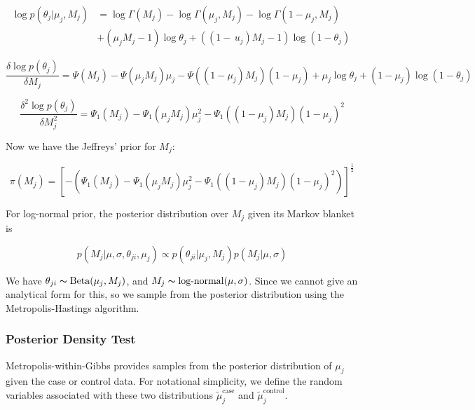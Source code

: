 \documentclass[11pt,reqno]{amsart}
\begin{document}
\begin{equation}\label{equ:JefferyInference1}
\begin{split}
\log p\left(\theta_{j}|\mu_{j},M_{j}\right)& =\log \Gamma \left(M_{j}\right)-\log \Gamma\left(\mu_{j},M_{j}\right)- \log \Gamma\left(1-\mu_{j},M_{j}\right)\\
& + (\mu_{j}M_{j}-1)\log\theta_{j} + ((1-\,u_{j})M_{j}-1)\log(1-\theta_{j})\
\end{split}
\end{equation}

\begin{equation}
\frac{\delta\log p(\theta_{j})}{\delta M_{j}} = \Psi(M_{j}) - \Psi(\mu_{j} M_{j})\mu_{j} - \Psi((1-\mu_{j})M_{j})(1-\mu_{j}) +\mu_{j}\log\theta_{j} + (1-\mu_{j})\log(1-\theta_{j})
\end{equation}

\begin{equation}
\frac{\delta^{2}\log p(\theta_{j})}{\delta M_{j}^{2}}  = \Psi_{1}(M_{j}) - \Psi_{1}(\mu_{j} M_{j})\mu_{j}^{2} - \Psi_{1}((1-\mu_{j})M_{j})(1-\mu_{j})^{2}
\end{equation}

Now we have the Jeffreys' prior for $M_{j}$:

\begin{equation}
\pi\left({M}_{j}\right) = [-\left(\Psi_{1}(M_{j}) - \Psi_{1}(\mu_{j} M_{j})\mu_{j}^{2} - \Psi_{1}((1-\mu_{j})M_{j}){(1-\mu_{j})^{2}}\right)]^{\frac{1}{2}}
\end{equation}

For log-normal prior, the posterior distribution over $M_{j}$ given its Markov blanket is

\begin{equation}
	p( M_{j} |\mu, \sigma, \theta_{ji},\mu_j) \propto p(\theta_{ji} | \mu_j, M_j) p(M_{j} | \mu, \sigma)
\end{equation}

We have $ \theta_{ji}\thicksim\text{Beta}(\mu_{j},M_{j})$, and $ M_{j} \thicksim \text{log-normal}(\mu, \sigma)$. Since we cannot give an analytical form for this, so we sample from the posterior distribution using the Metropolis-Hastings algorithm.


\subsubsection{Posterior Density Test}\label{sec:hypothesis_test}
Metropolis-within-Gibbs provides samples from the posterior distribution of $\mu_j$ given the case or control data. For notational simplicity, we define the random variables associated with these two distributions $\tilde{\mu}_j^{\text{case}}$ and $\tilde{\mu}_j^{\text{control}}$.
\end{document}
